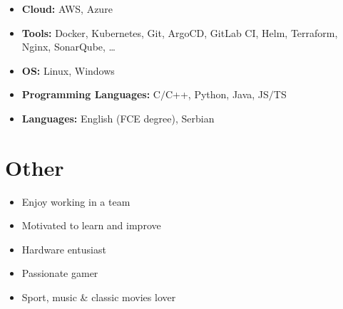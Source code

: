 \documentclass[a4paper]{moderncv}
\begin{document}
	\begin{itemize}
		
		\item \textbf{Cloud: } AWS, Azure
		\item \textbf{Tools: } Docker, Kubernetes, Git, ArgoCD, GitLab CI, Helm, Terraform, Nginx, SonarQube, \dots
		\item \textbf{OS: } Linux, Windows
		\item \textbf{Programming Languages: } C$\slash$C++, Python, Java, JS$\slash$TS
		\item \textbf{Languages: } English (FCE degree), Serbian
		
	\end{itemize}
%
%
\section{Other}
	\vspace{-1em}
	\begin{multicols*}{2}
		\begin{itemize}
			\setlength\itemsep{-1.2pt}
			\item Enjoy working in a team
			\item Motivated to learn and improve
			\item Hardware entusiast
			\item Passionate gamer
			\item Sport, music \& classic movies lover
		\end{itemize}		
	\end{multicols*}
	
\end{document}
